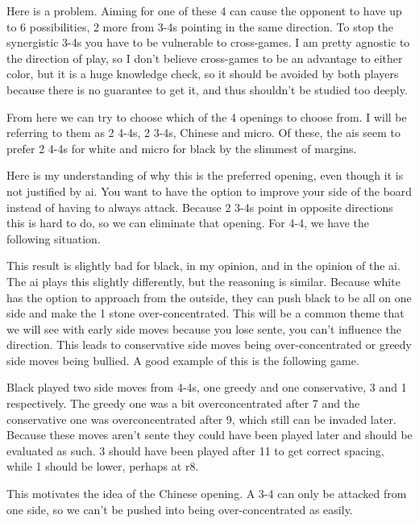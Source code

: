 \documentclass[12pt]{IEEEtran}
\begin{document}
\par
Here is a problem. Aiming for one of these 4 can cause the opponent to have up to 6 possibilities, 2 more from 3-4s pointing in the same direction. To stop the synergistic 3-4s you have to be vulnerable to cross-games. I am pretty agnostic to the direction of play, so I don't believe cross-games to be an advantage to either color, but it is a huge knowledge check, so it should be avoided by both players because there is no guarantee to get it, and thus shouldn't be studied too deeply. 
\par 
From here we can try to choose which of the 4 openings to choose from. I will be referring to them as 2 4-4s, 2 3-4s, Chinese and micro. Of these, the ais seem to prefer 2 4-4s for white and micro for black by the slimmest of margins. 
\par Here is my understanding of why this is the preferred opening, even though it is not justified by ai. You want to have the option to improve your side of the board instead of having to always attack. Because 2 3-4s point in opposite directions this is hard to do, so we can eliminate that opening. For 4-4, we have the following situation. 

\cleargoban
{}
\showfullgoban
\par
This result is slightly bad for black, in my opinion, and in the opinion of the ai. The ai plays this slightly differently, but the reasoning is similar. Because white has the option to approach from the outside, they can push black to be all on one side and make the 1 stone over-concentrated. This will be a common theme that we will see with early side moves because you lose sente, you can't influence the direction. This leads to conservative side moves being over-concentrated or greedy side moves being bullied. A good example of this is the following game.
\cleargoban
{}
\showfullgoban
\par
Black played two side moves from 4-4s, one greedy and one conservative, 3 and 1 respectively. The greedy one was a bit overconcentrated after 7 and the conservative one was overconcentrated after 9, which still can be invaded later. Because these moves aren't sente they could have been played later and should be evaluated as such. 3 should have been played after 11 to get correct spacing, while 1 should be lower, perhaps at r8. 
\par 
This motivates the idea of the Chinese opening. A 3-4 can only be attacked from one side, so we can't be pushed into being over-concentrated as easily. 
 \cleargoban
{}
\showfullgoban
\end{document}
